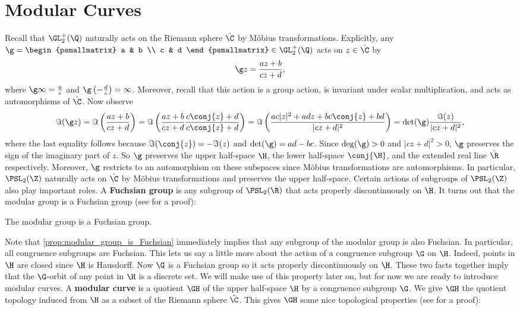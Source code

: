     \section{Modular Curves}
      Recall that $\GL_{2}^{+}(\Q)$ naturally acts on the Riemann sphere $\hat{\C}$ by M\"obius transformations. Explicitly, any $\g = \begin{psmallmatrix} a & b \\ c & d \end{psmallmatrix} \in \GL_{2}^{+}(\Q)$ acts on $z \in \hat{\C}$ by
      \[
        \g z = \frac{az+b}{cz+d},
      \]
      where $\g \infty = \frac{a}{c}$ and $\g\left(-\frac{d}{c}\right) = \infty$. Moreover, recall that this action is a group action, is invariant under scalar multiplication, and acts as automorphisms of $\hat{\C}$. Now observe
      \[
        \Im(\g z) = \Im\left(\frac{az+b}{cz+d}\right) = \Im\left(\frac{az+b}{cz+d}\frac{c\conj{z}+d}{c\conj{z}+d}\right) = \Im\left(\frac{ac|z|^{2}+adz+bc\conj{z}+bd}{|cz+d|^{2}}\right) = \det(\g)\frac{\Im(z)}{|cz+d|^{2}},
      \]
      where the last equality follows because $\Im(\conj{z}) = -\Im(z)$ and $\det(\g) = ad-bc$. Since $\deg(\g) > 0$ and $|cz+d|^{2} > 0$, $\g$ preserves the sign of the imaginary part of $z$. So $\g$ preserves the upper half-space $\H$, the lower half-space $\conj{\H}$, and the extended real line $\hat{\R}$ respectively. Moreover, $\g$ restricts to an automorphism on these subspaces since M\"obius transformations are automorphisms. In particular, $\PSL_{2}(\Z)$ naturally acts on $\hat{\C}$ by M\"obius transformations and preserves the upper half-space. Certain actions of subgroups of $\PSL_{2}(\Z)$ also play important roles. A \textbf{Fuchsian group} is any subgroup of $\PSL_{2}(\R)$ that acts properly discontinuously on $\H$. It turns out that the modular group is a Fuchsian group (see \cite{diamond2005first} for a proof):

      \begin{proposition}\label{prop:modular_group_is_Fuchsian}
        The modular group is a Fuchsian group.
      \end{proposition}

      Note that \cref{prop:modular_group_is_Fuchsian} immediately implies that any subgroup of the modular group is also Fuchsian. In particular, all congruence subgroups are Fuchsian. This lets us say a little more about the action of a congruence subgroup $\G$ on $\H$. Indeed, points in $\H$ are closed since $\H$ is Hausdorff. Now $\G$ is a Fuchsian group so it acts properly discontinuously on $\H$. These two facts together imply that the $\G$-orbit of any point in $\H$ is a discrete set. We will make use of this property later on, but for now we are ready to introduce modular curves. A \textbf{modular curve} is a quotient $\GH$ of the upper half-space $\H$ by a congruence subgroup $\G$. We give $\GH$ the quotient topology induced from $\H$ as a subset of the Riemann sphere $\hat{\C}$. This gives $\GH$ some nice topological properties (see \cite{diamond2005first} for a proof):
      
